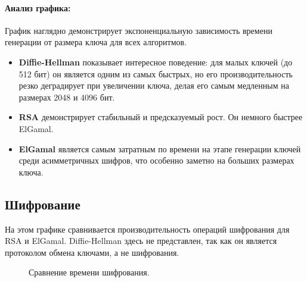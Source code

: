 \paragraph{Анализ графика:}
График наглядно демонстрирует экспоненциальную зависимость времени генерации от размера ключа для всех алгоритмов.
\begin{itemize}
    \item \textbf{Diffie-Hellman} показывает интересное поведение: для малых ключей (до 512 бит) он является одним из самых быстрых, но его производительность резко деградирует при увеличении ключа, делая его самым медленным на размерах 2048 и 4096 бит.
    \item \textbf{RSA} демонстрирует стабильный и предсказуемый рост. Он немного быстрее ElGamal.
    \item \textbf{ElGamal} является самым затратным по времени на этапе генерации ключей среди асимметричных шифров, что особенно заметно на больших размерах ключа.
\end{itemize}

\clearpage

\subsection{Шифрование}
На этом графике сравнивается производительность операций шифрования для RSA и ElGamal. Diffie-Hellman здесь не представлен, так как он является протоколом обмена ключами, а не шифрования.

\begin{figure}[h!]
\centering
{}
\caption{Сравнение времени шифрования.}
\label{fig:encryption}
\end{figure}

